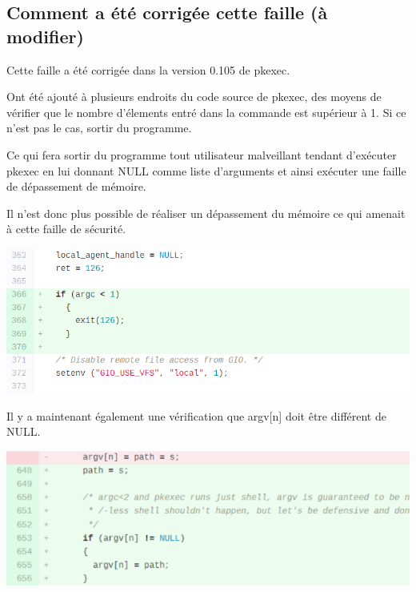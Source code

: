 \documentclass[12pt,a4paper]{article}
\begin{document}
		\subsection{Comment a été corrigée cette faille (à modifier)}
            \begin{flushleft}
                \noindent Cette faille a été corrigée dans la version 0.105 de pkexec.
                \item Ont été ajouté à plusieurs endroits du code source de pkexec, des moyens de vérifier que le nombre d'élements entré dans la commande est supérieur à 1. Si ce n'est pas le cas, sortir du programme. 
                \item Ce qui fera sortir du programme tout utilisateur malveillant tendant d'exécuter pkexec en lui donnant NULL comme liste d'arguments et ainsi exécuter une faille de dépassement de mémoire. \cite{pkexeclo25:online} 
                \item Il n'est donc plus possible de réaliser un dépassement du mémoire ce qui amenait à cette faille de sécurité.
                \begin{center}
                    \includegraphics[scale=0.5]{verifargcsize}
                    \cite{securitytrack:online}
                \end{center}
                \item Il y a maintenant également une vérification que argv[n] doit être différent de NULL.
                \begin{center}
                    \includegraphics[scale=0.5]{verifisnull}
                    \cite{securitytrack:online}
                \end{center}
            \end{flushleft}
            
\end{document}
